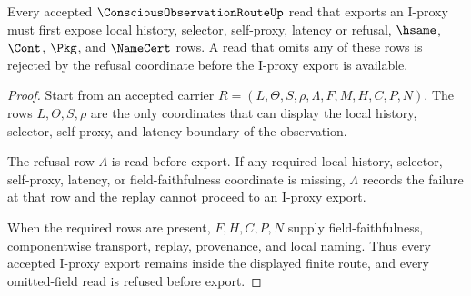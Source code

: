 \begin{theorem}
\label{thm:conscious-observation-route-latency-refusal}
Every accepted $\ConsciousObservationRouteUp$ read that exports an I-proxy must first expose local history, selector, self-proxy, latency or refusal, $\hsame$, $\Cont$, $\Pkg$, and $\NameCert$ rows. A read that omits any of these rows is rejected by the refusal coordinate before the I-proxy export is available.
\end{theorem}
\begin{proof}
Start from an accepted carrier $R=(L,\Theta,S,\rho,\Lambda,F,M,H,C,P,N)$. The rows $L,\Theta,S,\rho$ are the only coordinates that can display the local history, selector, self-proxy, and latency boundary of the observation.

The refusal row $\Lambda$ is read before export. If any required local-history, selector, self-proxy, latency, or field-faithfulness coordinate is missing, $\Lambda$ records the failure at that row and the replay cannot proceed to an I-proxy export.

When the required rows are present, $F,H,C,P,N$ supply field-faithfulness, componentwise transport, replay, provenance, and local naming. Thus every accepted I-proxy export remains inside the displayed finite route, and every omitted-field read is refused before export.
\end{proof}





